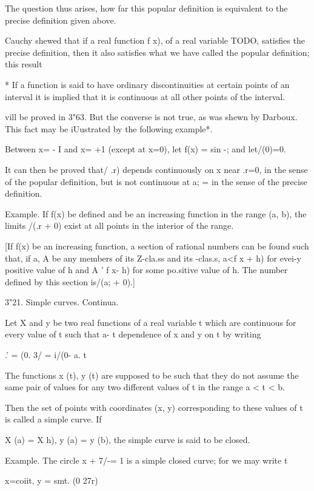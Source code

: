 The question thus arises, how far this popular definition is
equivalent to the precise definition given above.

Cauchy shewed that if a real function f x), of a real variable TODO,
satisfies the precise definition, then it also satisfies what we have
called the popular definition; this result

* If a function is said to have ordinary discontinuities at certain
points of an interval it is implied that it is continuous at all other
points of the interval.

%
%

vill be proved in 3"63. But the converse is not true, as was shewn by
Darboux. This fact may be iUustrated by the following example*.

Between x= - I and x= +1 (except at x=0), let f(x) = sin -; and
let/(0)=0.

It can then be proved that/ .r) depends continuously on x near .r=0,
in the sense of the popular definition, but is not continuous at a; =
in the sense of the precise definition.

Example. If f(x) be defined and be an increasing function in the range
(a, b), the limits /(.r + 0) exist at all points in the interior of
the range.

[If f(x) be an increasing function, a section of rational numbers can
be found such that, if a, A be any members of its Z-cla.ss and its
-clas.s, a<f x + h) for evei-y positive value of h and A ' f x- h) for
some po.sitive value of h. The number defined by this section is/(a; +
0).]

3"21. Simple curves. Continua.

Let X and y be two real functions of a real variable t which are
continuous for every value of t such that a- t %
dependence of x and y on t by writing

.' = (0. 3/ = i/(0- a. t%

The functions x (t), y (t) are supposed to be such that they do not
assume the same pair of values for any two different values of t in
the range a < t < b.

Then the set of points with coordinates (x, y) corresponding to these
values of t is called a simple curve. If

X (a) = X h), y (a) = y (b), the simple curve is said to be closed.

Example. The circle x + 7/-= 1 is a simple closed curve; for we may
write t

x=coiit, y = smt. (0 27r)

